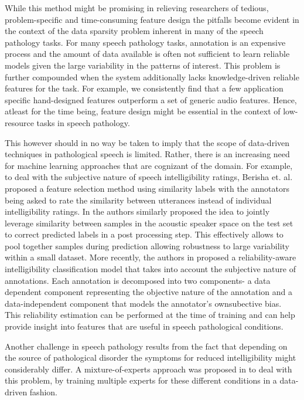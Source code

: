 \documentclass{article}
\begin{document}
While this method might be promising in relieving researchers of tedious, problem-specific and time-consuming feature design the pitfalls become evident in the context of the data sparsity problem inherent in many of the speech pathology tasks. For many speech pathology tasks, annotation is an expensive process and the amount of data available is often not sufficient to learn reliable models given the large variability in the patterns of interest. This problem is further compounded when the system additionally lacks knowledge-driven reliable features for the task. For example, we consistently find that a few application specific hand-designed features outperform a set of generic audio features\cite{kim2013pathology}. Hence, atleast for the time being, feature design might be essential in the context of low-resource tasks in speech pathology.

This however should in no way be taken to imply that the scope of data-driven techniques in pathological speech is limited. Rather, there is an increasing need for machine learning approaches that are cognizant of the domain. For example, to deal with the subjective nature of speech intelligibility ratings, Berisha et. al. \cite{berisha2014modeling} proposed a feature selection method using similarity labels with the annotators being asked to rate the similarity between utterances instead of individual intelligibility ratings.
In \cite{kim2013pathology} the authors similarly proposed the idea to jointly leverage similarity between samples in the acoustic speaker space on the test set to correct predicted labels in a post processing step. This effectively allows to pool together samples during prediction allowing robustness to large variability within a small dataset.
More recently, the authors in \cite{kumar2015maxentrel} proposed a reliability-aware intelligibility classification model that takes into account the subjective nature of annotations. Each annotation is decomposed into two components- a data dependent component representing the objective nature of the annotation and a data-independent component that models the annotator's ownsubective bias. This reliability estimation can be performed at the time of training and can help provide insight into features that are useful in speech pathological conditions.

Another challenge in speech pathology results from the fact that depending on the source of pathological disorder the symptoms for reduced intelligibility might considerably differ. A mixture-of-experts approach was proposed in \cite{gupta2014pathology} to deal with this problem, by training multiple experts for these different conditions in a data-driven fashion.
\end{document}
